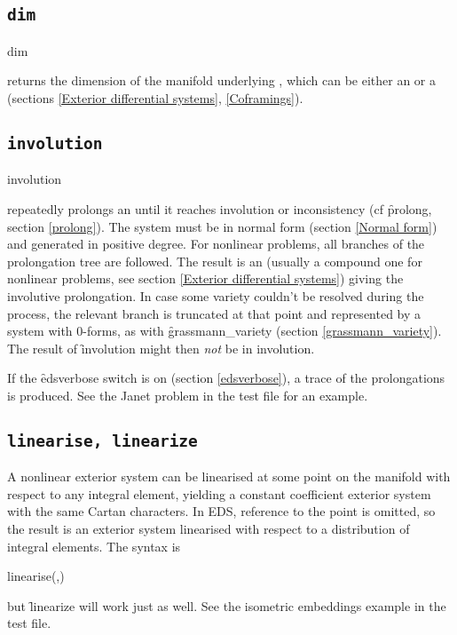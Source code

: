 \subsection{\tt dim}
\label{dim}

\begin{syntax}
	dim 
\end{syntax}
returns the dimension of the manifold underlying ,
which can be either an  or a  (sections \ref{Exterior
differential systems}, \ref{Coframings}).

\subsection{\tt involution}
\label{involution}

\begin{syntax}
	involution 
\end{syntax}
repeatedly prolongs an  until it reaches involution or
inconsistency (cf \f{prolong}, section \ref{prolong}). The system must be
in normal form (section \ref{Normal form}) and generated in positive
degree. For nonlinear problems, all branches of the prolongation tree are
followed. The result is an  (usually a compound one for
nonlinear problems, see section \ref{Exterior differential systems})
giving the involutive prolongation. In case some variety couldn't be
resolved during the process, the relevant branch is truncated at that point
and represented by a system with 0-forms, as with \f{grassmann\_variety}
(section \ref{grassmann_variety}). The result of \f{involution} might then
{\em not} be in involution.

If the \f{edsverbose} switch is on (section \ref{edsverbose}), a trace of
the prolongations is produced. See the Janet problem in the test file for
an example.

\subsection{\tt linearise, linearize}
\label{linearise}

A nonlinear exterior system can be linearised at some point on the
manifold with respect to any integral element, yielding a constant
coefficient exterior system with the same Cartan characters. In EDS,
reference to the point is omitted, so the result is an exterior system
linearised with respect to a distribution of integral elements. The syntax
is
\begin{syntax}
	linearise(,)
\end{syntax}
but \f{linearize} will work just as well. See the isometric embeddings
example in the test file.

